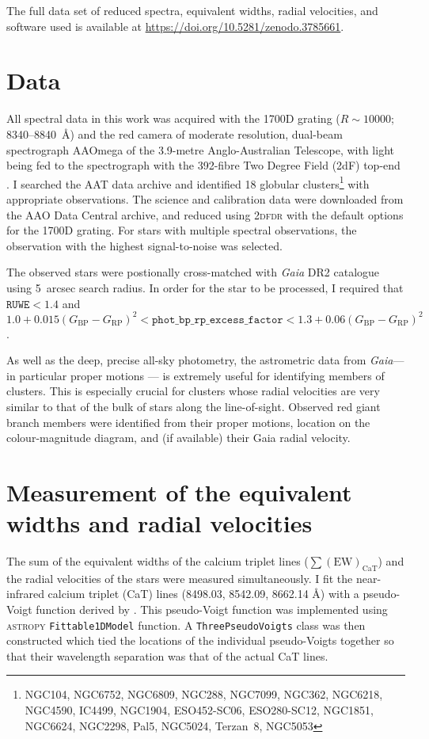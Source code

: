 \documentclass[RNAAS]{aastex63}
\newcommand{\bprp}{\ensuremath{G_\textrm{BP}-G_\textrm{RP}}}
\newcommand{\sumcat}{\ensuremath{\sum{(\mathrm{EW})_\mathrm{CaT}}}\xspace}
\newcommand{\gaia}{\textit{Gaia}\xspace}
\begin{document}
The full data set of reduced spectra, equivalent widths, radial velocities, and software used is available at \url{https://doi.org/10.5281/zenodo.3785661}.


\section{Data}
All spectral data in this work was acquired with the 1700D grating ($R\sim10000$; 8340--8840~\AA) and the red camera of moderate resolution, dual-beam spectrograph AAOmega \citep{Sharp2006} of the 3.9-metre Anglo-Australian Telescope, with light being fed to the spectrograph with the 392-fibre Two Degree Field (2dF) top-end \citep{Lewis2002}. I searched the AAT data archive and identified 18 globular clusters\footnote{NGC104, NGC6752, NGC6809, NGC288, NGC7099, NGC362, NGC6218, NGC4590, IC4499, NGC1904, ESO452-SC06, ESO280-SC12, NGC1851, NGC6624, NGC2298, Pal5, NGC5024, Terzan~8, NGC5053} with appropriate observations. The science and calibration data were downloaded from the AAO Data Central archive, and reduced using \textsc{2dfdr} \citep{AAOSoftwareTeam2015} with the default options for the 1700D grating. For stars with multiple spectral observations, the observation with the highest signal-to-noise was selected.

The observed stars were postionally cross-matched with \gaia DR2 catalogue \citep{GaiaCollaboration2016,GaiaCollaboration2018a} using 5~arcsec search radius. In order for the star to be processed, I required that $\texttt{RUWE}<1.4$ \citep{Lindegren2018a} and $1.0+0.015(\bprp)^2 < \mathrm{\texttt{phot\_bp\_rp\_excess\_factor}} <1.3+0.06(\bprp)^2$ \citep{Evans2018a}.

As well as the deep, precise all-sky photometry, the astrometric data from \gaia --- in particular proper motions --- is extremely useful for identifying members of clusters. This is especially crucial for clusters whose radial velocities are very similar to that of the bulk of stars along the line-of-sight. Observed red giant branch members were identified from their proper motions, location on the colour-magnitude diagram, and (if available) their Gaia radial velocity. 

\section{Measurement of the equivalent widths and radial velocities}
The sum of the equivalent widths of the calcium triplet lines (\sumcat) and the radial velocities of the stars were measured simultaneously. I fit the near-infrared calcium triplet (CaT) lines (8498.03, 8542.09, 8662.14 \AA) with a pseudo-Voigt function derived by \citet{Thompson1987}.
This pseudo-Voigt function was implemented using \textsc{astropy} \texttt{Fittable1DModel} function. A \texttt{ThreePseudoVoigts} class was then constructed which tied the locations of the individual pseudo-Voigts together so that their wavelength separation was that of the actual CaT lines.
\end{document}
